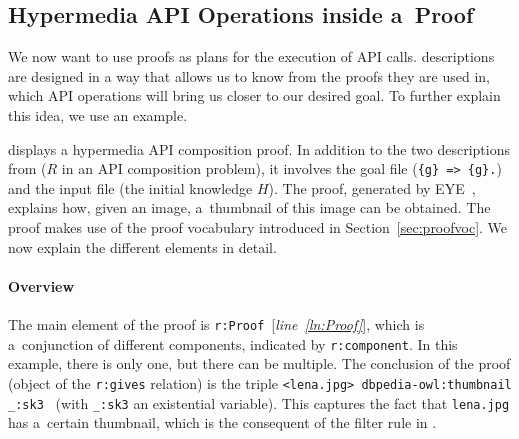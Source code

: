 \newcommand\lineref[1]{[\textit{line~\ref{#1}}]}
\newcommand\linesref[2]{[\textit{lines~\ref{#1}--\ref{#2}}]}


\subsection{Hypermedia API Operations inside a~Proof}\label{restdescinproof}
We now want to use proofs as plans for the execution of API calls. \restdesc descriptions are designed 
in a way that allows us to know from the proofs they are used in, which API operations will bring us closer to our desired goal. 
To further explain this idea, we use an example.

 displays a hypermedia API composition proof.
In addition to the two \restdesc descriptions from 
($R$ in an API composition problem),
it involves the goal file  (\texttt{\{g\} => \{g\}.})
and the input file  (the initial knowledge $H$).
The proof, generated by EYE~\cite{eyepaper},
explains how, given an image, a~thumbnail of this image can be obtained. The proof makes use of the proof vocabulary introduced in Section~\ref{sec:proofvoc}.
We now explain the different elements in detail.
\vspace{-1em}

\paragraph{\bfseries Overview}
The main element of the proof is \verb!r:Proof!~\lineref{ln:Proof},
which is a~conjunction of different components, indicated by \verb!r:component!.
In this example, there is only one,
but there can be multiple.
The conclusion of the proof
(object of the \verb!r:gives! relation)
is the triple
\verb!<lena.jpg> dbpedia-owl:thumbnail _:sk3 !%
(with \verb!_:sk3! an existential variable).
This captures the fact that \verb!lena.jpg! has a~certain thumbnail,
which is the consequent of the filter rule in .

